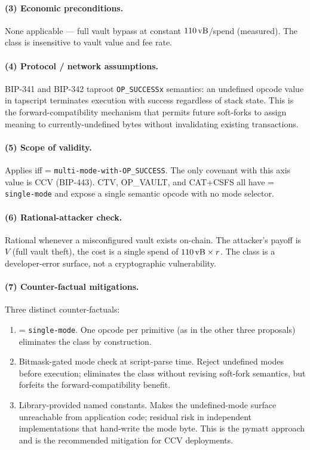 \paragraph{(3) Economic preconditions.}
None applicable --- full vault bypass at constant $110\,\text{vB}{}$/spend
(measured). The class is insensitive to vault value and fee rate.

\paragraph{(4) Protocol / network assumptions.}
BIP-341 and BIP-342 taproot \texttt{OP\_SUCCESSx} semantics: an
undefined opcode value in tapscript terminates execution with
success regardless of stack state. This is the forward-compatibility
mechanism that permits future soft-forks to assign meaning to
currently-undefined bytes without invalidating existing transactions.

\paragraph{(5) Scope of validity.}
Applies iff \axopsurf{} = \texttt{multi-mode-with-OP\_SUCCESS}. The
only covenant with this axis value is CCV (BIP-443). CTV, OP\_VAULT,
and CAT+CSFS all have \axopsurf{} = \texttt{single-mode} and expose
a single semantic opcode with no mode selector.

\paragraph{(6) Rational-attacker check.}
Rational whenever a misconfigured vault exists on-chain. The
attacker's payoff is $V$ (full vault theft), the cost is a single
spend of $110\,\text{vB}{} \times r$. The class is a developer-error surface,
not a cryptographic vulnerability.

\paragraph{(7) Counter-factual mitigations.}
Three distinct counter-factuals:
\begin{enumerate}
\item \axopsurf{} = \texttt{single-mode}. One opcode per primitive
  (as in the other three proposals) eliminates the class by
  construction.
\item Bitmask-gated mode check at script-parse time. Reject
  undefined modes before execution; eliminates the class without
  revising soft-fork semantics, but forfeits the forward-compatibility
  benefit.
\item Library-provided named constants. Makes the undefined-mode
  surface unreachable from application code; residual risk in
  independent implementations that hand-write the mode byte. This is
  the pymatt approach and is the recommended mitigation for CCV
  deployments.
\end{enumerate}

